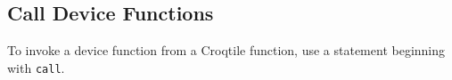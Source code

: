 \subsection*{Call Device Functions}

To invoke a device function from a Croqtile function, use a statement beginning with \texttt{call}.
